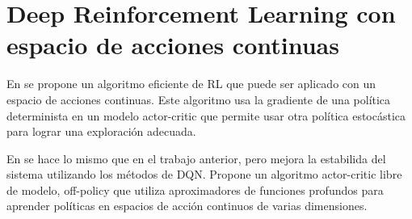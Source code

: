 \section{Deep Reinforcement Learning con espacio de acciones continuas}

En \cite{silver2014deterministic} se propone un algoritmo eficiente de \ac{RL} que puede ser aplicado con un espacio de acciones continuas. Este algoritmo usa la gradiente de una política determinista en un modelo actor-critic que permite usar otra política estocástica para lograr una exploración adecuada.

En \cite{lillicrap2015continuous} se hace lo mismo que en el trabajo anterior, pero mejora la estabilida del sistema utilizando los métodos de \ac{DQN}. Propone un algoritmo actor-critic libre de modelo, off-policy que utiliza aproximadores de funciones profundos para aprender políticas en espacios de acción continuos de varias dimensiones.
